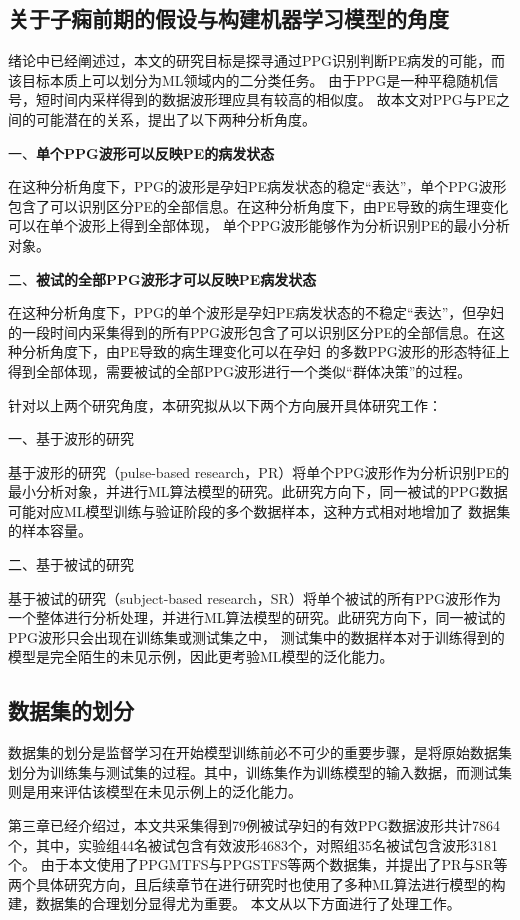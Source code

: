\subsection{关于子痫前期的假设与构建机器学习模型的角度}
绪论中已经阐述过，本文的研究目标是探寻通过PPG识别判断PE病发的可能，而该目标本质上可以划分为ML领域内的二分类任务。
由于PPG是一种平稳随机信号，短时间内采样得到的数据波形理应具有较高的相似度\cite{Qiu2012,PPGYY,Ma2015}。
故本文对PPG与PE之间的可能潜在的关系，提出了以下两种分析角度。

一、\textbf{单个PPG波形可以反映PE的病发状态}

在这种分析角度下，PPG的波形是孕妇PE病发状态的稳定“表达”，单个PPG波形包含了可以识别区分PE的全部信息。在这种分析角度下，由PE导致的病生理变化可以在单个波形上得到全部体现，
单个PPG波形能够作为分析识别PE的最小分析对象。

二、\textbf{被试的全部PPG波形才可以反映PE病发状态}

在这种分析角度下，PPG的单个波形是孕妇PE病发状态的不稳定“表达”，但孕妇的一段时间内采集得到的所有PPG波形包含了可以识别区分PE的全部信息。在这种分析角度下，由PE导致的病生理变化可以在孕妇
的多数PPG波形的形态特征上得到全部体现，需要被试的全部PPG波形进行一个类似“群体决策”的过程。

针对以上两个研究角度，本研究拟从以下两个方向展开具体研究工作：

一、基于波形的研究

基于波形的研究（pulse-based research，PR）将单个PPG波形作为分析识别PE的最小分析对象，并进行ML算法模型的研究。此研究方向下，同一被试的PPG数据可能对应ML模型训练与验证阶段的多个数据样本，这种方式相对地增加了
数据集的样本容量。

二、基于被试的研究

基于被试的研究（subject-based research，SR）将单个被试的所有PPG波形作为一个整体进行分析处理，并进行ML算法模型的研究。此研究方向下，同一被试的PPG波形只会出现在训练集或测试集之中，
测试集中的数据样本对于训练得到的模型是完全陌生的未见示例，因此更考验ML模型的泛化能力。

\subsection{数据集的划分}
数据集的划分是监督学习在开始模型训练前必不可少的重要步骤，是将原始数据集划分为训练集与测试集的过程。其中，训练集作为训练模型的输入数据，而测试集则是用来评估该模型在未见示例上的泛化能力。

第三章已经介绍过，本文共采集得到79例被试孕妇的有效PPG数据波形共计7864个，其中，实验组44名被试包含有效波形4683个，对照组35名被试包含波形3181个。
由于本文使用了PPGMTFS与PPGSTFS等两个数据集，并提出了PR与SR等两个具体研究方向，且后续章节在进行研究时也使用了多种ML算法进行模型的构建，数据集的合理划分显得尤为重要。
本文从以下方面进行了处理工作。

